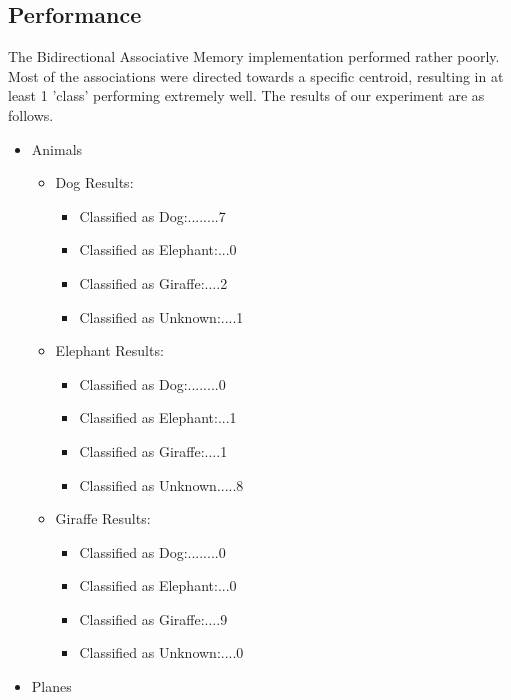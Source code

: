\documentclass{article}
\begin{document}
\subsection{Performance}
The Bidirectional Associative Memory implementation performed rather poorly. 
Most of the associations were directed towards a specific centroid, resulting 
in at least 1 'class' performing extremely well. The results of our 
experiment are as follows.

\begin{itemize}
    \item Animals
        \begin{itemize}
            \item Dog Results:
                \begin{itemize}
                    \item Classified as Dog:........7
                    \item Classified as Elephant:...0
                    \item Classified as Giraffe:....2
                    \item Classified as Unknown:....1
                \end{itemize}
            \item Elephant Results:
                \begin{itemize}
                    \item Classified as Dog:........0
                    \item Classified as Elephant:...1
                    \item Classified as Giraffe:....1
                    \item Classified as Unknown.....8
                \end{itemize}
            \item Giraffe Results:
                \begin{itemize}
                    \item Classified as Dog:........0
                    \item Classified as Elephant:...0
                    \item Classified as Giraffe:....9
                    \item Classified as Unknown:....0
                \end{itemize}
        \end{itemize}
    \item Planes
        \begin{itemize}

\end{itemize}
\end{itemize}
\end{document}
